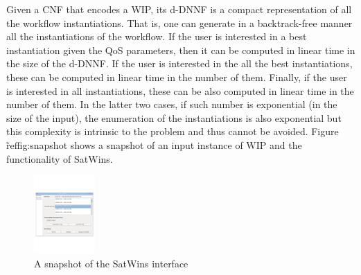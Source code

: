 \documentclass{llncs}
\begin{document}
Given a CNF that encodes a WIP, its d-DNNF is a compact representation of
all the workflow instantiations. That is, one can generate in a backtrack-free
manner all the instantiations of the workflow. If the user is interested in
a best instantiation given the QoS parameters, then it can be computed in
linear time in the size of the d-DNNF. If the user is interested in the 
all the best instantiations, these can be computed in linear time in the
number of them. Finally, if the user is interested in all instantiations,
these can be also computed in linear time in the number of them.
In the latter two cases, if such number is exponential (in the size of the
input), the enumeration of the instantiations is also exponential but
this complexity is intrinsic to the problem and thus cannot be avoided.
Figure \~ref{fig:snapshot} shows a snapshot of an input instance of WIP and the functionality of SatWins. 

\begin{figure}[t]
\centering
\includegraphics[height=30mm,width=.7\textwidth]{demo}
\caption{A snapshot of the SatWins interface}
\label{fig:snapshot}
\end{figure}
\end{document}
